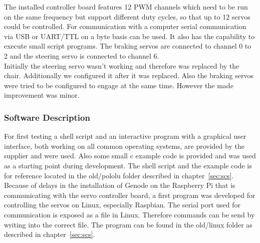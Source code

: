 The installed controller board features 12 PWM channels which need to be run on the same frequency but support different duty cycles, so that up to 12 servos could be controlled. For communication with a computer serial communication via USB or UART/TTL on a byte basis can be used. It also has the capability to execute small script programs. The braking servos are connected to channel 0 to 2 and the steering servo is connected to channel 6.\\

Initially the steering servo wasn't working and therefore was replaced by the chair. Additionally we configured it after it was replaced. Also the braking servos were tried to be configured to engage at the same time. However the made improvement was minor. 

\subsubsection{Software Description}
For first testing a shell script and an interactive program with a graphical user interface, both working on all common operating systems, are provided by the supplier and were used. Also some small c example code is provided and was used as a starting point during development. The shell script and the example code is for reference located in the old/pololu folder described in chapter~\ref{sec:scs}.\\

Because of delays in the installation of Genode on the Raspberry Pi that is communicating with the servo controller board, a first program was developed for controlling the servos on Linux, especially Raspbian. The serial port used for communication is exposed as a file in Linux. Therefore commands can be send by writing into the correct file. The program can be found in the old/linux folder as described in chapter~\ref{sec:scs}.